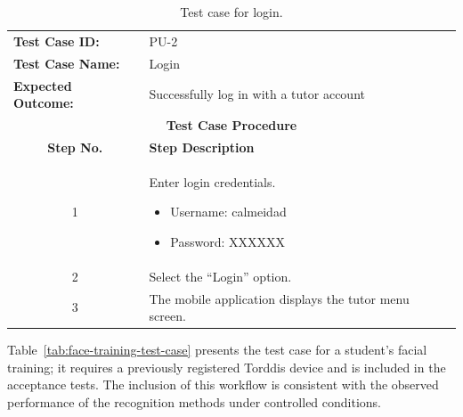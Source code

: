                 \begin{table}[!htbp]
                    \centering
                    \caption{Test case for login.}
                    \label{tab:login-test-case}
                    \begin{tabularx}{\textwidth}{l X}
                        \toprule
                        \textbf{Test Case ID:} & PU-2 \\
                        \textbf{Test Case Name:} & Login \\
                        \textbf{Expected Outcome:} & Successfully log in with a tutor account \\
                        \midrule
                        \multicolumn{2}{c}{\textbf{Test Case Procedure}} \\
                        \midrule
                        \multicolumn{1}{c}{\textbf{Step No.}} & \textbf{Step Description} \\
                        \midrule
                        \multicolumn{1}{c}{1} & Enter login credentials.
                        \begin{itemize}
                            \item Username: calmeidad
                            \item Password: XXXXXX
                        \end{itemize} \\
                        \multicolumn{1}{c}{2} & Select the ``Login'' option. \\
                        \multicolumn{1}{c}{3} & The mobile application displays the tutor menu screen. \\
                        \bottomrule
                    \end{tabularx}
                \end{table}
                
                Table~\ref{tab:face-training-test-case} presents the test case for a student’s facial training; it requires a previously registered Torddis device and is included in the acceptance tests. The inclusion of this workflow is consistent with the observed performance of the recognition methods under controlled conditions.                
                
